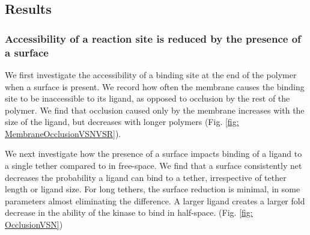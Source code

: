 \documentclass[../../AdvancementSummary.tex]{subfiles}
\begin{document}
%
%



\subsection{Results}

\subsubsection{Accessibility of a reaction site is reduced by the presence of a surface}

We first investigate the accessibility of a binding site at the end of the polymer when a surface is present. We record how often the membrane causes the binding site to be inaccessible to its ligand, as opposed to occlusion by the rest of the polymer. We find that occlusion caused only by the membrane increases with the size of the ligand, but decreases with longer polymers (Fig. \ref{fig: MembraneOcclusionVSNVSR}). 

We next investigate how the presence of a surface impacts binding of a ligand to a single tether compared to in free-space. We find that a surface consistently net decreases the probability a ligand can bind to a tether, irrespective of tether length or ligand size. For long tethers, the surface reduction is minimal, in some parameters almost eliminating the difference. A larger ligand creates a larger fold decrease in the ability of the kinase to bind in half-space. (Fig. \ref{fig: OcclusionVSN})
\end{document}
